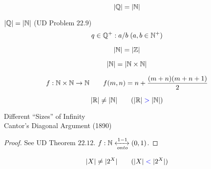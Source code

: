 \begin{frame}{}
  \begin{theorem}[$\aleph_0$ (1874)]
    \[
      |\mathbb{Q}| = |\mathbb{N}|
    \]
  \end{theorem}

  \pause
  \begin{exampleblock}{$|\mathbb{Q}| = |\mathbb{N}|$ (UD Problem $22.9$)}
    \[
      q \in \mathbb{Q}^{+}: a / b \; (a,b \in \mathbb{N}^{+})
    \]
  \end{exampleblock}
\end{frame}

\begin{frame}{}
  \[
    |\mathbb{N}| = |\mathbb{Z}|
  \]

  \pause
  \[
    |\mathbb{N}| = |\mathbb{N} \times \mathbb{N}|
  \]

  \pause
  \[
    f: \mathbb{N} \times \mathbb{N} \to \mathbb{N} \qquad f(m,n) = n + \frac{(m+n)(m+n+1)}{2}
  \]
\end{frame}

\begin{frame}{}
  \begin{theorem}
    \[
      |\mathbb{R}| \neq |\mathbb{N}| \qquad (|\mathbb{R}| \;\textcolor{blue}{>}\; |\mathbb{N}|)
    \]
  \end{theorem}

  \pause
  \vspace{0.30cm}
  \begin{center}
    Different ``Sizes'' of Infinity \\[10pt] \pause
    Cantor's Diagonal Argument (1890)
  \end{center}

  \pause
  \begin{proof}
    \centerline{See UD Theorem $22.12$. \quad $f: \mathbb{N} \xleftrightarrow[onto]{1-1} (0,1)$.}
  \end{proof}

  \pause
  \vspace{0.20cm}
  \begin{theorem}
    \[
      |X| \neq |2^{X}| \qquad (|X| \;\textcolor{blue}{<}\; |2^{X}|)
    \]
  \end{theorem}
\end{frame}

